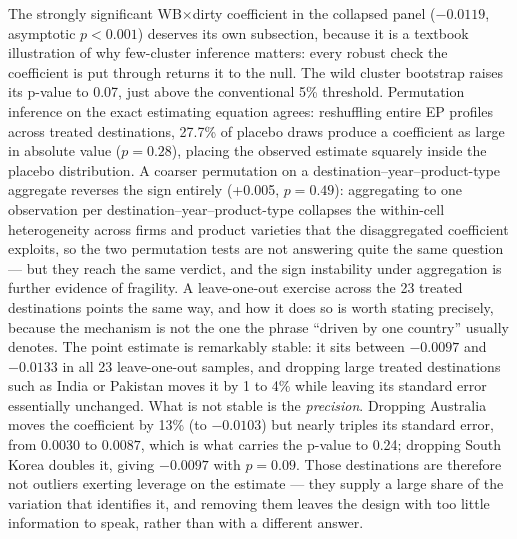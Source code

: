 \documentclass[12pt]{article}
\begin{document}
The strongly significant WB$\times$dirty coefficient in the collapsed panel
($-0.0119$, asymptotic $p<0.001$) deserves its own subsection, because it is a
textbook illustration of why few-cluster inference matters: every robust check the
coefficient is put through returns it to the null. The wild cluster bootstrap raises its
p-value to 0.07, just above the conventional 5\% threshold. Permutation inference on the
exact estimating equation agrees: reshuffling entire EP profiles across treated
destinations, 27.7\% of placebo draws produce a coefficient as large in absolute value
($p=0.28$), placing the observed estimate squarely inside the placebo distribution. A
coarser permutation on a destination--year--product-type aggregate reverses the sign
entirely (+0.005, $p=0.49$): aggregating to one observation per
destination--year--product-type collapses the within-cell heterogeneity across firms and
product varieties that the disaggregated coefficient exploits, so the two permutation
tests are not answering quite the same question --- but they reach the same verdict, and
the sign instability under aggregation is further evidence of fragility. A leave-one-out
exercise across the 23 treated destinations points the same way, and how it does so is
worth stating precisely, because the mechanism is not the one the phrase
``driven by one country'' usually denotes. The point estimate is remarkably stable: it
sits between $-0.0097$ and $-0.0133$ in all 23 leave-one-out samples, and dropping large
treated destinations such as India or Pakistan moves it by 1 to 4\% while leaving its
standard error essentially unchanged. What is not stable is the \emph{precision}. Dropping
Australia moves the coefficient by 13\% (to $-0.0103$) but nearly triples its standard
error, from $0.0030$ to $0.0087$, which is what carries the p-value to 0.24; dropping
South Korea doubles it, giving $-0.0097$ with $p=0.09$. Those destinations are therefore
not outliers exerting leverage on the estimate --- they supply a large share of the
variation that identifies it, and removing them leaves the design with too little
information to speak, rather than with a different answer.
\end{document}
